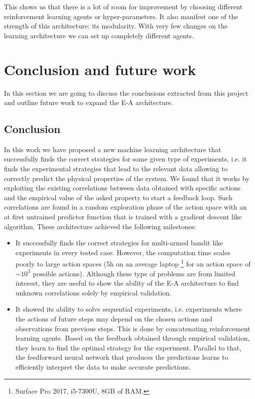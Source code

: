 \documentclass[11pt,a4paper,twoside]{report}
\newcommand{\+}{\textnormal{+} }
\theoremstyle{definition}
\numberwithin{equation}{chapter}
\begin{document}
This shows us that there is a lot of room for improvement by choosing different 
reinforcement learning agents or hyper-parameters. It also manifest one of the 
strength of this architecture: its modularity. With very few changes on the 
learning architecture we can set up completely different agents.


\chapter{Conclusion and future work}

In this section we are going to discuss the conclusions extracted from this
project and outline future work to expand the E-A architecture.

\section{Conclusion}

In this work we have proposed a new machine learning architecture that
successfully finds the correct strategies for some given type of experiments,
i.e. it finds the experimental strategies that lead to the relevant data
allowing to correctly predict the physical properties of the system. We found
that it works by exploiting the existing correlations between data obtained with
specific actions and the empirical value of the asked property to start a
feedback loop. Such correlations are found in a random exploration phase of the
action space with an at first untrained predictor function that is trained with
a gradient descent like algorithm. These architecture achieved the following
milestones:

\begin{itemize}
  \item It successfully finds the correct strategies for multi-armed bandit like
  experiments in every tested case. However, the computation time scales poorly
  to large action spaces (5h on an average laptop \footnote{Surface Pro 2017,
  i5-7300U, 8GB of RAM.} for an action space of $\sim 10^3$ possible actions).
  Although these type of problems are from limited interest, they are useful to
  show the ability of the E-A architecture to find unknown correlations solely
  by empirical validation.
  \item It showed its ability to solve sequential experiments, i.e. experiments
  where the actions of future steps may depend on the chosen actions and
  observations from previous steps. This is done by concatenating reinforcement
  learning agents. Based on the feedback obtained through empirical validation,
  they learn to find the optimal strategy for the experiment. Parallel to that,
  the feedforward neural network that produces the predictions learns to
  efficiently interpret the data to make accurate predictions.
\end{itemize}
\end{document}
